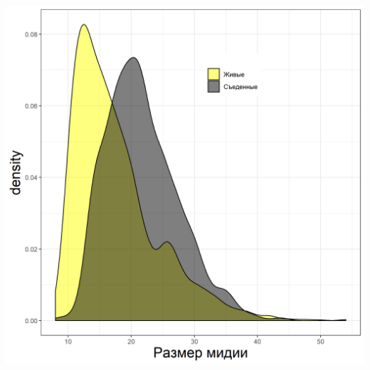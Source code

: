 \documentclass[20pt,a0,portrait]{a0poster}
\begin{document}
\begin{minipage}[t]{0.5\linewidth}		

\subsection*{}



%
\begin{minipage}[t]{0.46\linewidth}		
	\begin{center}\vspace{0.1cm}
			\includegraphics[width=0.9\linewidth]{Size_dist_hem.png}
			\label{Fig_siz_hem}
		\end{center}\vspace{0.5cm}
\end{minipage}\hspace{2cm}
%
\begin{minipage}[t]{0.46\linewidth}		
	\begin{center}\vspace{0.1cm}

\end{center}
\end{minipage}
\end{minipage}
\end{document}
